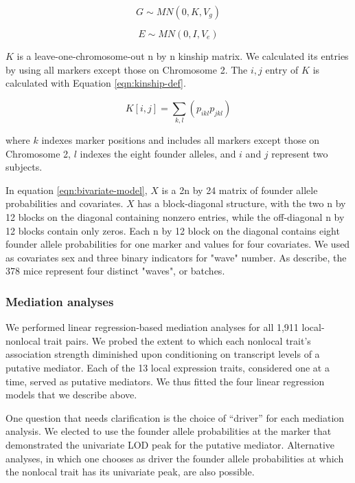 \documentclass{article}
\begin{document}
\begin{equation}
    G \sim MN(0, K, V_g)
\end{equation}

\begin{equation}
    E \sim MN(0, I, V_e)
\end{equation}

$K$ is a leave-one-chromosome-out n by n kinship matrix. We calculated its entries by using all markers except those on Chromosome 2. The $i, j$ entry of $K$ is calculated with Equation \ref{eqn:kinship-def}.

\begin{equation}
    K[i, j] = \sum_{k,l} (p_{ikl} p_{jkl})
    \label{eqn:kinship-def}
\end{equation}

where $k$ indexes marker positions and includes all markers except those on Chromosome 2, $l$ indexes the eight founder alleles, and $i$ and $j$ represent two subjects. 

In equation \ref{eqn:bivariate-model}, $X$ is a 2n by 24 matrix of founder allele probabilities and covariates. $X$ has a block-diagonal structure, with the two n by 12 blocks on the diagonal containing nonzero entries, while the off-diagonal n by 12 blocks contain only zeros. Each n by 12 block on the diagonal contains eight founder allele probabilities for one marker and values for four covariates. We used as covariates sex and three binary indicators for "wave" number. As \citet{keller2018genetic} describe, the 378 mice represent four distinct "waves", or batches.

\subsubsection{Mediation analyses}

We performed linear regression-based mediation analyses for all 1,911 local-nonlocal trait pairs. We probed the extent to which each nonlocal trait's association strength diminished upon conditioning on transcript levels of a putative mediator. Each of the 13 local expression traits, considered one at a time, served as putative mediators. We thus fitted the four linear regression models that we describe above. 

One question that needs clarification is the choice of ``driver'' for each mediation analysis. We elected to use the founder allele probabilities at the marker that demonstrated the univariate LOD peak for the putative mediator. Alternative analyses, in which one chooses as driver the founder allele probabilities at which the nonlocal trait has its univariate peak, are also possible.
\end{document}
